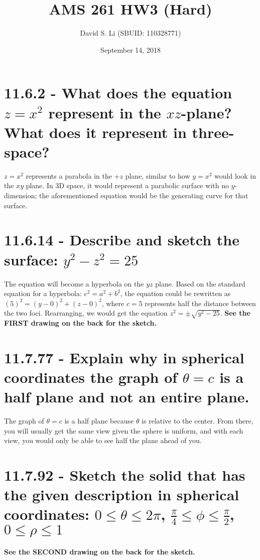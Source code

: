 \documentclass{article}
\title{AMS 261 HW3 (Hard)}
\author{David S. Li (SBUID: 110328771)}
\date{September 14, 2018}
\begin{document}
\maketitle

\section{11.6.2 - What does the equation $z = x^{2}$ represent in the $xz$-plane?  What does it represent in three-space?}

\par\noindent\Large $z = x^{2}$ represents a parabola in the $+z$ plane, similar to how $y = x^{2}$ would look in the $xy$ plane.  In 3D space, it would represent a parabolic surface with no $y$-dimension; the aforementioned equation would be the generating curve for that surface.
\section{11.6.14 - Describe and sketch the surface: $y^{2} - z^{2} = 25$}

\par\noindent\Large The equation will become a hyperbola on the $yz$ plane.  Based on the standard equation for a hyperbola: $c^{2} = a^{2} + b^{2}$, the equation could be rewritten as $(5)^{2} = (y - 0)^{2} + (z - 0)^{2}$, where $c = 5$ represents half the distance between the two foci.  Rearranging, we would get the equation $z^{2} = \pm\sqrt{y^{2} - 25}$.  \textbf{See the FIRST drawing on the back for the sketch.}

\section{11.7.77 - Explain why in spherical coordinates the graph of $\theta = c$ is a half plane and not an entire plane.}
\par\noindent\Large The graph of $\theta = c$ is a half plane because $\theta$ is relative to the center.  From there, you will usually get the same view given the sphere is uniform, and with each view, you would only be able to see half the plane ahead of you.

\section{11.7.92 - Sketch the solid that has the given description in spherical coordinates: $0 \leq \theta \leq 2\pi$, $\frac{\pi}{4} \leq \phi \leq \frac{\pi}{2}$, $0 \leq \rho \leq 1$}
\par\noindent\Large \textbf{See the SECOND drawing on the back for the sketch.}
\end{document}
